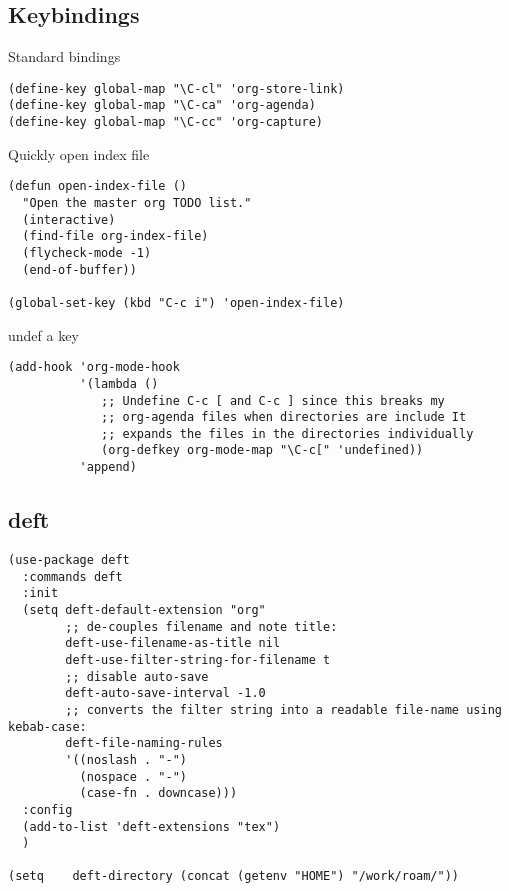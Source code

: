 \documentclass[12pt]{article}
\begin{document}
\subsection{Keybindings}
\label{sec:orgbc1cad5}


Standard bindings

\begin{verbatim}
(define-key global-map "\C-cl" 'org-store-link)
(define-key global-map "\C-ca" 'org-agenda)
(define-key global-map "\C-cc" 'org-capture)
\end{verbatim}

Quickly open index file
\begin{verbatim}
(defun open-index-file ()
  "Open the master org TODO list."
  (interactive)
  (find-file org-index-file)
  (flycheck-mode -1)
  (end-of-buffer))

(global-set-key (kbd "C-c i") 'open-index-file)
\end{verbatim}


undef a key

\begin{verbatim}
(add-hook 'org-mode-hook
          '(lambda ()
             ;; Undefine C-c [ and C-c ] since this breaks my
             ;; org-agenda files when directories are include It
             ;; expands the files in the directories individually
             (org-defkey org-mode-map "\C-c[" 'undefined))
          'append)

\end{verbatim}

\subsection{deft}
\label{sec:org6a16d37}

\begin{verbatim}
(use-package deft
  :commands deft
  :init
  (setq deft-default-extension "org"
        ;; de-couples filename and note title:
        deft-use-filename-as-title nil
        deft-use-filter-string-for-filename t
        ;; disable auto-save
        deft-auto-save-interval -1.0
        ;; converts the filter string into a readable file-name using kebab-case:
        deft-file-naming-rules
        '((noslash . "-")
          (nospace . "-")
          (case-fn . downcase)))
  :config
  (add-to-list 'deft-extensions "tex")
  )

(setq    deft-directory (concat (getenv "HOME") "/work/roam/"))
\end{verbatim}
\end{document}
